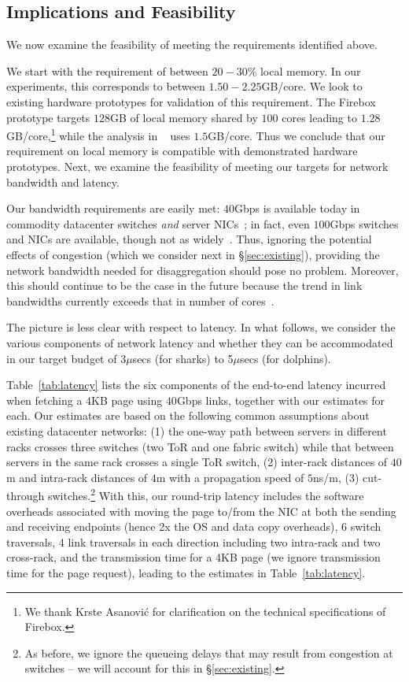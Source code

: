 \subsection{Implications and Feasibility}
\label{ssec:rtt}
\vspace{-0.05in}
We now examine the feasibility of meeting the requirements identified above. 

 We start with the requirement of between $20-30$\% local memory. In our experiments, this corresponds to between $1.50-2.25$GB/core. We look to existing hardware prototypes for validation of this requirement. The Firebox prototype targets $128$GB of local memory shared by $100$ cores leading to $1.28$GB/core,\footnote{We thank Krste Asanovi{\'c} for clarification on the technical specifications of Firebox.} while the analysis in ~\cite{ddcHwDesign1} uses $1.5$GB/core. Thus we conclude that our requirement on local memory is compatible with demonstrated hardware prototypes.
Next, we examine the feasibility of meeting our targets for network bandwidth and latency.


 Our bandwidth requirements are easily met: $40$Gbps is available today in commodity datacenter switches \emph{and} server NICs~\cite{40gnic}; in fact, even $100$Gbps switches and NICs are available, though not as widely~\cite{100gnic}.
Thus, ignoring the potential effects of congestion (which we consider next in \S\ref{sec:existing}), providing the network bandwidth needed for disaggregation should pose no problem. Moreover, this should continue to be the case in the future because the trend in link bandwidths currently exceeds that in number of cores~\cite{hmc1, hmc2, hmc3}.


 The picture is less clear with respect to latency. In what follows, we consider the various components of network latency and whether they can be accommodated in our target budget of 3$\mu$secs (for sharks) to 5$\mu$secs (for dolphins).

Table~\ref{tab:latency} lists the six components of the end-to-end latency incurred when fetching  a $4$KB page using $40$Gbps links, together with our estimates for each. Our estimates are based on the following common assumptions about existing datacenter networks: (1) the one-way path between servers in different racks crosses three switches (two ToR and one fabric switch) while that between servers in the same rack crosses a single ToR switch, (2) inter-rack distances of $40$m and intra-rack distances of $4$m with a propagation speed of $5$ns/m, (3) cut-through switches.\footnote{As before, we ignore the queueing delays that may result from congestion at switches -- we will account for this in \S\ref{sec:existing}.}  
With this, our round-trip latency includes the software overheads associated with moving the page to/from the NIC at both the sending and receiving endpoints (hence 2x the OS and data copy overheads), 6 switch traversals, 4 link traversals in each direction including two intra-rack and two cross-rack, and the transmission time for a 4KB page (we ignore transmission time for the page request), leading to the estimates in Table~\ref{tab:latency}. 

